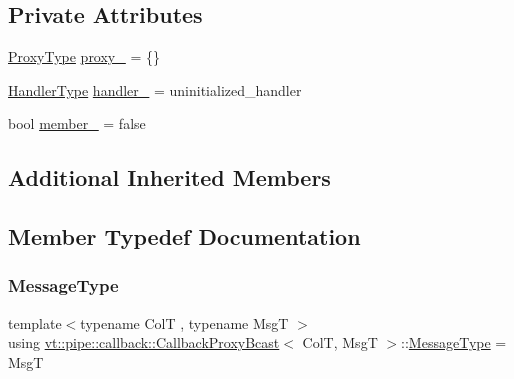 \subsection*{Private Attributes}
\begin{DoxyCompactItemize}
\item 
\hyperlink{structvt_1_1pipe_1_1callback_1_1_callback_proxy_bcast_a27c62cb9cbd1dcd3f135dcd98d98c991}{Proxy\+Type} \hyperlink{structvt_1_1pipe_1_1callback_1_1_callback_proxy_bcast_ac10679541d8f497b5c2440e5c780aab2}{proxy\+\_\+} = \{\}
\item 
\hyperlink{namespacevt_af64846b57dfcaf104da3ef6967917573}{Handler\+Type} \hyperlink{structvt_1_1pipe_1_1callback_1_1_callback_proxy_bcast_a586222031b5cc4c5e3bd77655331c527}{handler\+\_\+} = uninitialized\+\_\+handler
\item 
bool \hyperlink{structvt_1_1pipe_1_1callback_1_1_callback_proxy_bcast_a999642d39e7d3db11230085be3bbd896}{member\+\_\+} = false
\end{DoxyCompactItemize}
\subsection*{Additional Inherited Members}


\subsection{Member Typedef Documentation}
\mbox{\label{structvt_1_1pipe_1_1callback_1_1_callback_proxy_bcast_ad65703bd011d36432495be4451ea61e7}} 
\subsubsection{\texorpdfstring{Message\+Type}{MessageType}}
{\footnotesize\ttfamily template$<$typename ColT , typename MsgT $>$ \\
using \hyperlink{structvt_1_1pipe_1_1callback_1_1_callback_proxy_bcast}{vt\+::pipe\+::callback\+::\+Callback\+Proxy\+Bcast}$<$ ColT, MsgT $>$\+::\hyperlink{structvt_1_1pipe_1_1callback_1_1_callback_proxy_bcast_ad65703bd011d36432495be4451ea61e7}{Message\+Type} =  MsgT}

